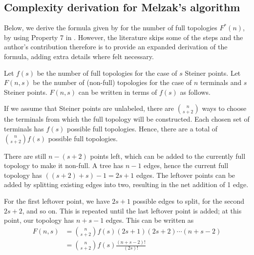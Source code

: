 \documentclass{l4proj}
\begin{document}
\begin{appendices}

    \chapter{Complexity derivation for Melzak's algorithm}
    \label{app:melzak_complexity}

    Below, we derive the formula given by \citet{geosteiner96} for the number of full topologies $F^*(n)$, by using Property 7 in \citet{Gilbert1968SteinerMT}. However, the literature skips some of the steps and the author's contribution therefore is to provide an expanded derivation of the formula, adding extra details where felt necessary.

    Let $f(s)$ be the number of full topologies for the case of $s$ Steiner points.
    Let $F(n, s)$ be the number of (non-full) topologies for the case of $n$ terminals and $s$ Steiner points. $F(n, s)$ can be written in terms of $f(s)$ as follows.

    If we assume that Steiner points are unlabeled, there are $\binom{n}{s+2}$ ways to choose the terminals from which the full topology will be constructed. Each chosen set of terminals has $f(s)$ possible full topologies. Hence, there are a total of $\binom {n}{s+2}f(s)$ possible full topologies.

    There are still $n - (s + 2)$ points left, which can be added to the currently full topology to make it non-full. A tree has $n - 1$ edges, hence the current full topology has $((s + 2) + s) - 1 = 2s + 1$ edges. The leftover points can be added by splitting existing edges into two, resulting in the net addition of 1 edge.

    For the first leftover point, we have $2s + 1$ possible edges to split, for the second $2s + 2$, and so on. This is repeated until the last leftover point is added; at this point, our topology has $n + s - 1$ edges. This can be written as
    \begin{equation*}
        \begin{aligned}
            F(n, s) & = \binom{n}{s+2}f(s)(2s + 1)(2s + 2)\cdots(n + s - 2) \\
                    & = \binom{n}{s+2}f(s)\frac{(n + s - 2)!}{(2s)!}
        \end{aligned}
    \end{equation*}


\end{appendices}
\end{document}
